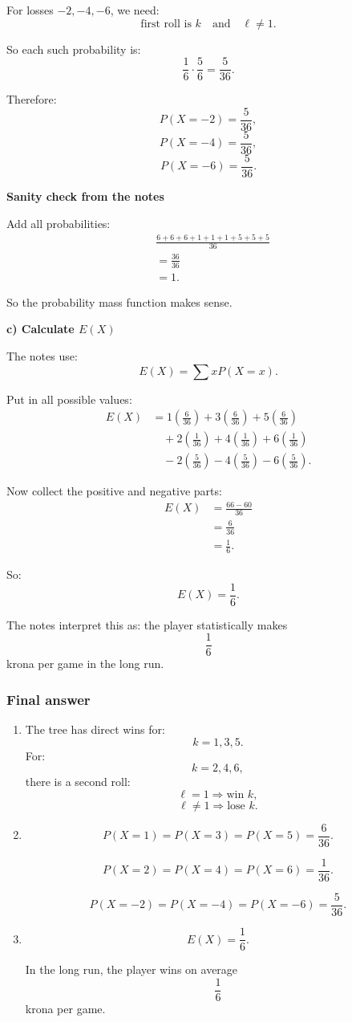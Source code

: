 \documentclass[10pt]{article}
\begin{document}
For losses \(-2,-4,-6\), we need:
\[
\text{first roll is }k
\quad\text{and}\quad
\ell\ne 1.
\]

So each such probability is:
\[
\frac16\cdot\frac56=\frac{5}{36}.
\]

Therefore:
\[
P(X=-2)=\frac{5}{36},
\]
\[
P(X=-4)=\frac{5}{36},
\]
\[
P(X=-6)=\frac{5}{36}.
\]

\textbf{Sanity check from the notes}

Add all probabilities:
\begin{align*}
&\frac{6+6+6+1+1+1+5+5+5}{36}
\\[2mm]
&=
\frac{36}{36}
\\[2mm]
&=1.
\end{align*}

So the probability mass function makes sense.

\textbf{c) Calculate \(E(X)\)}

The notes use:
\[
E(X)=\sum xP(X=x).
\]

Put in all possible values:
\begin{align*}
E(X)
&=
1\left(\frac{6}{36}\right)
+3\left(\frac{6}{36}\right)
+5\left(\frac{6}{36}\right)
\\
&\quad
+2\left(\frac{1}{36}\right)
+4\left(\frac{1}{36}\right)
+6\left(\frac{1}{36}\right)
\\
&\quad
-2\left(\frac{5}{36}\right)
-4\left(\frac{5}{36}\right)
-6\left(\frac{5}{36}\right).
\end{align*}

Now collect the positive and negative parts:
\begin{align*}
E(X)
&=
\frac{66-60}{36}
\\[2mm]
&=
\frac{6}{36}
\\[2mm]
&=
\frac{1}{6}.
\end{align*}

So:
\[
E(X)=\frac{1}{6}.
\]

The notes interpret this as:
the player statistically makes
\[
\frac{1}{6}
\]
krona per game in the long run.

\subsubsection*{Final answer}

\begin{enumerate}[label=\alph*)]
\item
The tree has direct wins for:
\[
k=1,3,5.
\]
For:
\[
k=2,4,6,
\]
there is a second roll:
\[
\ell=1 \Rightarrow \text{win }k,
\]
\[
\ell\ne 1 \Rightarrow \text{lose }k.
\]

\item
\[
P(X=1)=P(X=3)=P(X=5)=\frac{6}{36}.
\]

\[
P(X=2)=P(X=4)=P(X=6)=\frac{1}{36}.
\]

\[
P(X=-2)=P(X=-4)=P(X=-6)=\frac{5}{36}.
\]

\item
\[
E(X)=\frac{1}{6}.
\]

In the long run, the player wins on average
\[
\frac{1}{6}
\]
krona per game.
\end{enumerate}
\end{document}
